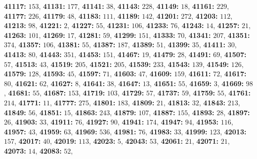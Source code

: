 \textsf{\bfseries 41117:} $153$, \textsf{\bfseries 41131:} $177$, \textsf{\bfseries 41141:} $38$, \textsf{\bfseries 41143:} $228$, \textsf{\bfseries 41149:} $18$, \textsf{\bfseries 41161:} $229$, \textsf{\bfseries 41177:} $226$, \textsf{\bfseries 41179:} $48$, \textsf{\bfseries 41183:} $111$, \textsf{\bfseries 41189:} $142$, \textsf{\bfseries 41201:} $272$, \textsf{\bfseries 41203:} $112$, \textsf{\bfseries 41213:} $98$, \textsf{\bfseries 41221:} $2$, \textsf{\bfseries 41227:} $55$, \textsf{\bfseries 41231:} $106$, \textsf{\bfseries 41233:} $76$, \textsf{\bfseries 41243:} $14$, \textsf{\bfseries 41257:} $21$, \textsf{\bfseries 41263:} $101$, \textsf{\bfseries 41269:} $17$, \textsf{\bfseries 41281:} $59$, \textsf{\bfseries 41299:} $151$, \textsf{\bfseries 41333:} $70$, \textsf{\bfseries 41341:} $207$, \textsf{\bfseries 41351:} $374$, \textsf{\bfseries 41357:} $106$, \textsf{\bfseries 41381:} $55$, \textsf{\bfseries 41387:} $187$, \textsf{\bfseries 41389:} $51$, \textsf{\bfseries 41399:} $35$, \textsf{\bfseries 41411:} $30$, \textsf{\bfseries 41413:} $80$, \textsf{\bfseries 41443:} $351$, \textsf{\bfseries 41453:} $151$, \textsf{\bfseries 41467:} $19$, \textsf{\bfseries 41479:} $28$, \textsf{\bfseries 41491:} $69$, \textsf{\bfseries 41507:} $57$, \textsf{\bfseries 41513:} $43$, \textsf{\bfseries 41519:} $205$, \textsf{\bfseries 41521:} $205$, \textsf{\bfseries 41539:} $233$, \textsf{\bfseries 41543:} $139$, \textsf{\bfseries 41549:} $126$, \textsf{\bfseries 41579:} $128$, \textsf{\bfseries 41593:} $45$, \textsf{\bfseries 41597:} $71$, \textsf{\bfseries 41603:} $47$, \textsf{\bfseries 41609:} $159$, \textsf{\bfseries 41611:} $72$, \textsf{\bfseries 41617:} $80$, \textsf{\bfseries 41621:} $62$, \textsf{\bfseries 41627:} $8$, \textsf{\bfseries 41641:} $38$, \textsf{\bfseries 41647:} $13$, \textsf{\bfseries 41651:} $55$, \textsf{\bfseries 41659:} $3$, \textsf{\bfseries 41669:} $98$, \textsf{\bfseries 41681:} $55$, \textsf{\bfseries 41687:} $153$, \textsf{\bfseries 41719:} $103$, \textsf{\bfseries 41729:} $57$, \textsf{\bfseries 41737:} $59$, \textsf{\bfseries 41759:} $55$, \textsf{\bfseries 41761:} $214$, \textsf{\bfseries 41771:} $11$, \textsf{\bfseries 41777:} $275$, \textsf{\bfseries 41801:} $183$, \textsf{\bfseries 41809:} $21$, \textsf{\bfseries 41813:} $32$, \textsf{\bfseries 41843:} $213$, \textsf{\bfseries 41849:} $56$, \textsf{\bfseries 41851:} $15$, \textsf{\bfseries 41863:} $243$, \textsf{\bfseries 41879:} $107$, \textsf{\bfseries 41887:} $155$, \textsf{\bfseries 41893:} $28$, \textsf{\bfseries 41897:} $26$, \textsf{\bfseries 41903:} $33$, \textsf{\bfseries 41911:} $76$, \textsf{\bfseries 41927:} $90$, \textsf{\bfseries 41941:} $174$, \textsf{\bfseries 41947:} $94$, \textsf{\bfseries 41953:} $116$, \textsf{\bfseries 41957:} $43$, \textsf{\bfseries 41959:} $63$, \textsf{\bfseries 41969:} $536$, \textsf{\bfseries 41981:} $76$, \textsf{\bfseries 41983:} $33$, \textsf{\bfseries 41999:} $123$, \textsf{\bfseries 42013:} $157$, \textsf{\bfseries 42017:} $40$, \textsf{\bfseries 42019:} $113$, \textsf{\bfseries 42023:} $5$, \textsf{\bfseries 42043:} $53$, \textsf{\bfseries 42061:} $21$, \textsf{\bfseries 42071:} $21$, \textsf{\bfseries 42073:} $14$, \textsf{\bfseries 42083:} $52$, 
